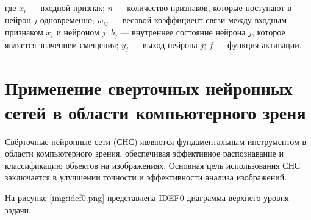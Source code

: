 	где \(x_i\) --- входной признак; \(n\) --- количество признаков, которые поступают в нейрон \(j\) одновременно; \(w_{ij}\) --- весовой коэффициент связи между входным признаком \(x_i\) и нейроном \(j\); \(b_j\) --- внутреннее состояние нейрона \(j\), которое является значением смещения; \(y_j\) --- выход нейрона \(j\); \(f\) --- функция активации.


\section{Применение сверточных нейронных сетей в области компьютерного зреня}

Свёрточные нейронные сети (СНС) являются фундаментальным инструментом в области компьютерного зрения, обеспечивая эффективное распознавание и классификацию объектов на изображениях. Основная цель использования СНС заключается в улучшении точности и эффективности анализа изображений.

На рисунке \ref{img:idef0.png} представлена IDEF0-диаграмма верхнего уровня задачи.


	

